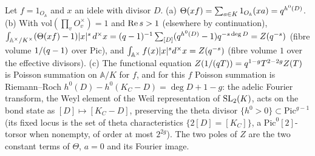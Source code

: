 \begin{proposition}
\label{prop:theta-functional-bond-state}
Let $f = 1_{O_{\mathbb A}}$ and $x$ an idele with divisor $D$. (a) $\Theta(xf) = \sum_{a\in K}1_{O_{\mathbb A}}(xa) = q^{h^0(D)}$.
(b) With $\mathrm{vol}(\prod_vO_v^\times) = 1$ and $\operatorname{Re} s>1$ (elsewhere by continuation), $\int_{\mathbb A^\times/K^\times}(\Theta(xf)-1)|x|^s\,d^\times x =
(q-1)^{-1}\sum_{[D]}(q^{h^0(D)}-1)q^{-s\deg D} = Z(q^{-s})$ (fibre volume $1/(q-1)$ over $\mathrm{Pic}$), and
$\int_{\mathbb A^\times}f(x)|x|^sd^\times x = Z(q^{-s})$ (fibre volume $1$ over the effective divisors). (c) The
functional equation $Z(1/(q T)) = q^{1-g}T^{2-2g}Z(T)$ is Poisson summation on $\mathbb A/K$ for $f$, and for
this $f$ Poisson summation is Riemann--Roch $h^0(D)-h^0(K_C-D) = \deg D+1-g$: the adelic Fourier transform, the
Weyl element of the Weil representation of $\mathrm{SL}_2(K)$, acts on the bond state as $[D]\mapsto[K_C-D]$, preserving
the theta divisor $\{h^0>0\}\subset\mathrm{Pic}^{g-1}$ (its fixed locus is the set of theta characteristics
$\{2[D] = [K_C]\}$, a $\mathrm{Pic}^0[2]$-torsor when nonempty, of order at most $2^{2g}$). The two poles of $Z$ are the two constant terms of $\Theta$, $a = 0$ and its Fourier image.
\end{proposition}

